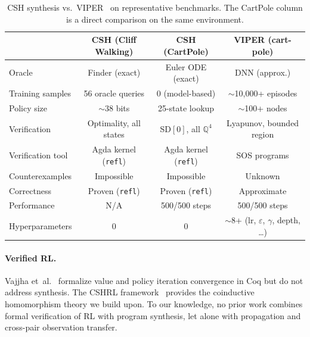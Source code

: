 \documentclass[9pt,a4paper]{article}
\theoremstyle{plain}
\theoremstyle{definition}
\theoremstyle{remark}
\begin{document}
\begin{table}[H]
\centering
\caption{CSH synthesis vs.\ VIPER~\cite{Bastani2018} on representative benchmarks.  The CartPole column is a direct comparison on the same environment.}
\label{tab:viper}
\small
\begin{tabular}{@{}lccc@{}}
& \textbf{CSH (Cliff Walking)} & \textbf{CSH (CartPole)} & \textbf{VIPER (cart-pole)} \\
\hline
Oracle & Finder (exact) & Euler ODE (exact) & DNN (approx.) \\
Training samples & 56 oracle queries & 0 (model-based) & ${\sim}$10{,}000+ episodes \\
Policy size & $\sim$38 bits & 25-state lookup & $\sim$100+ nodes \\
Verification & Optimality, all states & SD$[0]$, all $\mathbb{Q}^4$ & Lyapunov, bounded region \\
Verification tool & Agda kernel (\texttt{refl}) & Agda kernel (\texttt{refl}) & SOS programs \\
Counterexamples & Impossible & Impossible & Unknown \\
Correctness & Proven (\texttt{refl}) & Proven (\texttt{refl}) & Approximate \\
Performance & N/A & 500/500 steps & 500/500 steps \\
Hyperparameters & 0 & 0 & ${\sim}$8+ (lr, $\varepsilon$, $\gamma$, depth, \ldots) \\
\end{tabular}
\end{table}

\paragraph{Verified RL.}  Vajjha et~al.~\cite{Vajjha2021} formalize value and policy iteration convergence in Coq but do not address synthesis.  The CSHRL framework~\cite{CSHRL2026} provides the coinductive homomorphism theory we build upon.  To our knowledge, no prior work combines formal verification of RL with program synthesis, let alone with propagation and cross-pair observation transfer.
\end{document}
